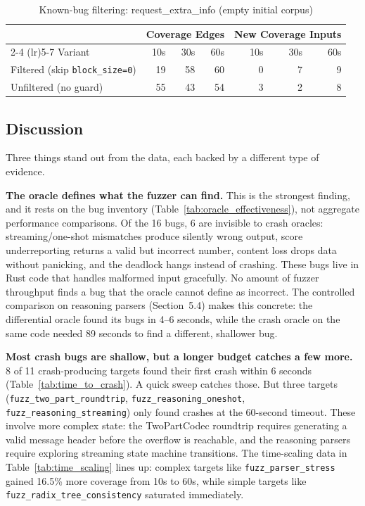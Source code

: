 \documentclass[11pt]{article}
\begin{document}
\begin{table}[H]
\centering
\caption{Known-bug filtering: request\_extra\_info (empty initial corpus)}
\label{tab:filtering}
\footnotesize
\begin{tabular}{@{}lrrrrrr@{}}
\toprule
 & \multicolumn{3}{c}{Coverage Edges} & \multicolumn{3}{c}{New Coverage Inputs} \\
\cmidrule(lr){2-4} \cmidrule(lr){5-7}
Variant & 10s & 30s & 60s & 10s & 30s & 60s \\
\midrule
Filtered (skip \texttt{block\_size=0})   & 19 & 58 & 60 & 0 & 7 & 9 \\
Unfiltered (no guard)                    & 55 & 43 & 54 & 3 & 2 & 8 \\
\bottomrule
\end{tabular}
\end{table}

\subsection{Discussion}

Three things stand out from the data, each backed by a different type of evidence.

\textbf{The oracle defines what the fuzzer can find.} This is the strongest finding, and it rests on the bug inventory (Table~\ref{tab:oracle_effectiveness}), not aggregate performance comparisons. Of the 16 bugs, 6 are invisible to crash oracles: streaming/one-shot mismatches produce silently wrong output, score underreporting returns a valid but incorrect number, content loss drops data without panicking, and the deadlock hangs instead of crashing. These bugs live in Rust code that handles malformed input gracefully. No amount of fuzzer throughput finds a bug that the oracle cannot define as incorrect. The controlled comparison on reasoning parsers (Section~5.4) makes this concrete: the differential oracle found its bugs in 4--6 seconds, while the crash oracle on the same code needed 89 seconds to find a different, shallower bug.

\textbf{Most crash bugs are shallow, but a longer budget catches a few more.} 8 of 11 crash-producing targets found their first crash within 6 seconds (Table~\ref{tab:time_to_crash}). A quick sweep catches those. But three targets (\texttt{fuzz\_two\_part\_roundtrip}, \texttt{fuzz\_reasoning\_oneshot}, \texttt{fuzz\_reasoning\_streaming}) only found crashes at the 60-second timeout. These involve more complex state: the TwoPartCodec roundtrip requires generating a valid message header before the overflow is reachable, and the reasoning parsers require exploring streaming state machine transitions. The time-scaling data in Table~\ref{tab:time_scaling} lines up: complex targets like \texttt{fuzz\_parser\_stress} gained 16.5\% more coverage from 10s to 60s, while simple targets like \texttt{fuzz\_radix\_tree\_consistency} saturated immediately.
\end{document}
